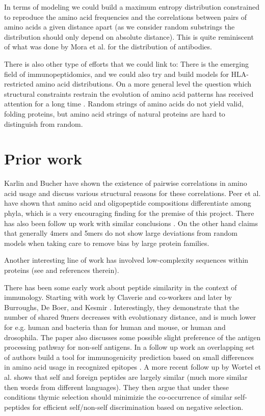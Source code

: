 \documentclass[superscriptaddress,twocolumn,pre]{revtex4}
\newcommand{\<}{\langle}
\renewcommand{\>}{\rangle}
\begin{document}
In terms of modeling we could build a maximum entropy distribution constrained to reproduce the amino acid frequencies and the correlations between pairs of amino acids a given distance apart (as we consider random substrings the distribution should only depend on absolute distance). This is quite reminiscent of what was done by Mora et al. \cite{Mora2010} for the distribution of antibodies.

There is also other type of efforts that we could link to: There is the emerging field of immunopeptidomics, and we could also try and build models for HLA-restricted amino acid distributions.
On a more general level the question which structural constraints restrain the evolution of amino acid patterns has received attention for a long time \cite{Turjanski2018}. Random strings of amino acids do not yield valid, folding proteins, but amino acid strings of natural proteins are hard to distinguish from random.


\section{Prior work}

Karlin and Bucher \cite{Karlin1992} have shown the existence of pairwise correlations in amino acid usage and discuss various structural reasons for these correlations. Peer et al. \cite{Peer2004} have shown that amino acid and oligopeptide compositions differentiate among phyla, which is a very encouraging finding for the premise of this project. There has also been follow up work with similar conclusions \cite{Bogatyreva2006}. On the other hand \cite{Lavelle2009} claims that generally 4mers and 5mers do not show large deviations from random models when taking care to remove bias by large protein families.

Another interesting line of work has involved low-complexity sequences within proteins (see \cite{Cascarina2018} and references therein).

There has been some early work about peptide similarity in the context of immunology. Starting with work by Claverie and co-workers \cite{Claverie1988} and later by Burroughs, De Boer, and Kesmir \cite{Burroughs2004}. Interestingly, they demonstrate that the number of shared 9mers decreases with evolutionary distance, and is much lower for e.g. human and bacteria than for human and mouse, or human and drosophila. The paper also discusses some possible slight preference of the antigen processing pathway for non-self antigens. In a follow up work an overlapping set of authors build a tool for immunogenicity prediction based on small differences in amino acid usage in recognized epitopes \cite{Calis2013}. A more recent follow up by Wortel et al. \cite{Wortel2018} shows that self and foreign peptides are largely similar (much more similar then words from different languages). They then argue that under these conditions thymic selection should minimizie the co-occurrence of similar self-peptides for efficient self/non-self discrimination based on negative selection. 
\end{document}
